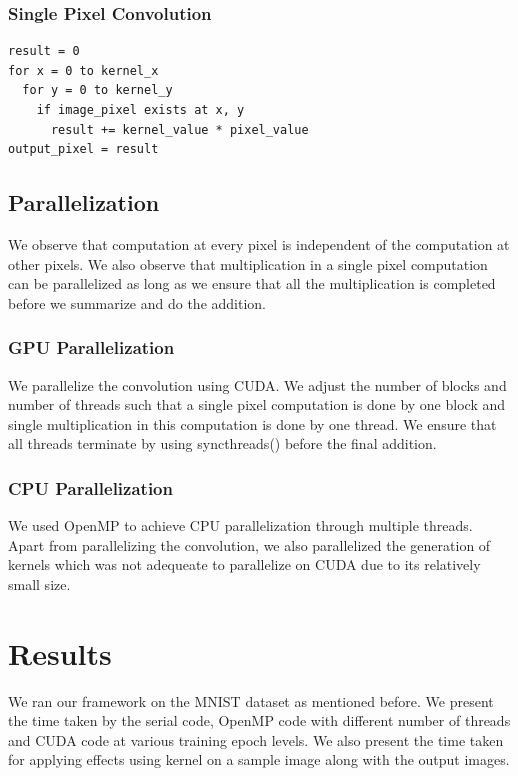 \documentclass[conference]{IEEEtran}
\begin{document}
\begin{frame}
\frametitle{Single Pixel Convolution}
  \lstset{language=C++}
\begin{lstlisting}
result = 0
for x = 0 to kernel_x
  for y = 0 to kernel_y
    if image_pixel exists at x, y 
      result += kernel_value * pixel_value
output_pixel = result
\end{lstlisting}
\end{frame}

\vspace{-20pt}

\subsection{Parallelization}
We observe that computation at every pixel is independent of the computation at other pixels. We also observe that multiplication in a single pixel computation can be parallelized as long as we ensure that all the multiplication is completed before we summarize and do the addition. \\
\subsubsection{GPU Parallelization}
We parallelize the convolution using CUDA. We adjust the number of blocks and number of threads such that a single pixel computation is done by one block and single multiplication in this computation is done by one thread. We ensure that all threads terminate by using \textunderscore \textunderscore syncthreads() before the final addition.
\subsubsection{CPU Parallelization}
We used OpenMP to achieve CPU parallelization through multiple threads. Apart from parallelizing the convolution, we also parallelized the generation of kernels which was not adequeate to parallelize on CUDA due to its relatively small size.

\vspace{-10pt}
\section{Results}
We ran our framework on the MNIST dataset as mentioned before. We present the time taken by the serial code, OpenMP code with different number of threads and CUDA code at various training epoch levels. We also present the time taken for applying effects using kernel on a sample image along with the output images.
\end{document}
